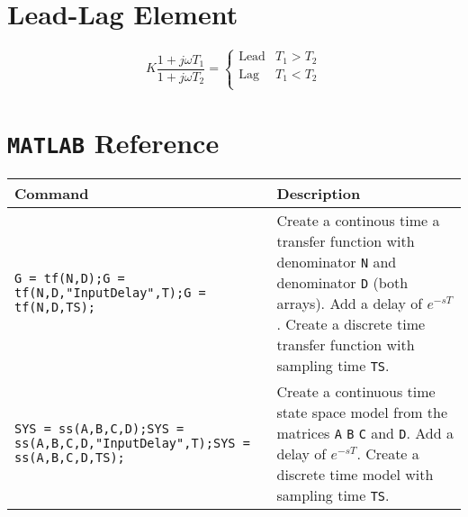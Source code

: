 \begin{landscape}
\begin{multicols*}{2}
\begin{figure}[H]
		\end{figure}

		\section{Lead-Lag Element}

		\[
			K \frac{1 + j\omega T_1}{1 + j\omega T_2} =
			\begin{cases}
				\text{Lead} & T_1 > T_2 \\
				\text{Lag} & T_1 < T_2 \\
			\end{cases}
		\]


		\columnbreak

		\section{\texttt{MATLAB} Reference}

		\begin{table}[H]
			\footnotesize
			\begin{tabularx}{\linewidth}{p{5cm} X}
				\toprule
				\bfseries Command & \bfseries Description \\
				\midrule

				\texttt{G = tf(N,D);\newline G = tf(N,D,"InputDelay",T);\newline G = tf(N,D,TS);} & Create a continous time a transfer function with denominator \texttt{N} and denominator \texttt{D} (both arrays). Add a delay of \(e^{-sT}\). Create a discrete time transfer function with sampling time \texttt{TS}. \\

				\midrule

				\texttt{SYS = ss(A,B,C,D);\newline SYS = ss(A,B,C,D,"InputDelay",T);\newline SYS = ss(A,B,C,D,TS);} & Create a continuous time state space model from the matrices \texttt{A} \texttt{B} \texttt{C} and \texttt{D}. Add a delay of \(e^{-sT}\). Create a discrete time model with sampling time \texttt{TS}. \\


\end{tabularx}
\end{table}
\end{multicols*}
\end{landscape}
